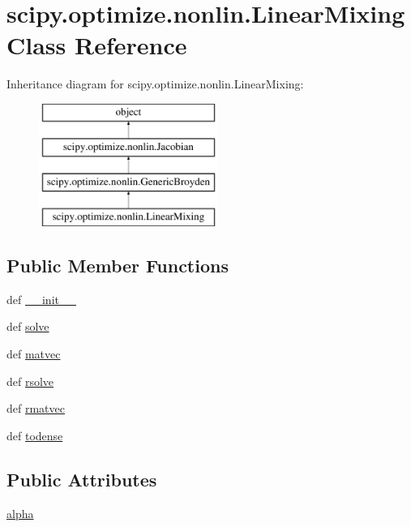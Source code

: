 \hypertarget{classscipy_1_1optimize_1_1nonlin_1_1LinearMixing}{}\section{scipy.\+optimize.\+nonlin.\+Linear\+Mixing Class Reference}
\label{classscipy_1_1optimize_1_1nonlin_1_1LinearMixing}
Inheritance diagram for scipy.\+optimize.\+nonlin.\+Linear\+Mixing\+:\begin{figure}[H]
\begin{center}
\leavevmode
\includegraphics[height=4.000000cm]{classscipy_1_1optimize_1_1nonlin_1_1LinearMixing}
\end{center}
\end{figure}
\subsection*{Public Member Functions}
\begin{DoxyCompactItemize}
\item 
def \hyperlink{classscipy_1_1optimize_1_1nonlin_1_1LinearMixing_a1aad658aced9aa92ca98b83ca4cca225}{\+\_\+\+\_\+init\+\_\+\+\_\+}
\item 
def \hyperlink{classscipy_1_1optimize_1_1nonlin_1_1LinearMixing_aca487219e82b06ef793306a745825bfa}{solve}
\item 
def \hyperlink{classscipy_1_1optimize_1_1nonlin_1_1LinearMixing_a9109df3a2f96c364419dce9558bfa1ac}{matvec}
\item 
def \hyperlink{classscipy_1_1optimize_1_1nonlin_1_1LinearMixing_a04e34f64ed2de0d4423daf1b16e1d19d}{rsolve}
\item 
def \hyperlink{classscipy_1_1optimize_1_1nonlin_1_1LinearMixing_a989f8724514b6155f61668ea5d0cbf47}{rmatvec}
\item 
def \hyperlink{classscipy_1_1optimize_1_1nonlin_1_1LinearMixing_a4314058e37a537c1c670a9af10f1c2c9}{todense}
\end{DoxyCompactItemize}
\subsection*{Public Attributes}
\begin{DoxyCompactItemize}
\item 
\hyperlink{classscipy_1_1optimize_1_1nonlin_1_1LinearMixing_a120821e675f5e8cb9b0a4842dc9ef6bf}{alpha}
\end{DoxyCompactItemize}


